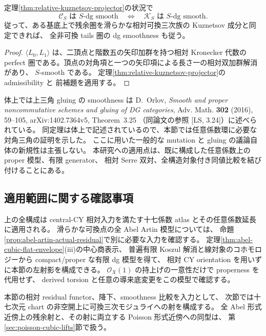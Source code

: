 \begin{corollary}
\label{cor:relative-kuznetsov-smooth-equivalence}
定理\ref{thm:relative-kuznetsov-projector}の状況で
\[
 \mathcal C_S\text{ は }S\text{-dg smooth}
 \quad\Longleftrightarrow\quad
 \mathcal K_S\text{ は }S\text{-dg smooth}.
\]
従って、ある基底上で残余圏を滑らかな相対可換三次族の Kuznetsov 成分と同定できれば、
全非可換 tails 圏の dg smoothness も従う。
\end{corollary}
\begin{proof}
$\langle L_0,L_1\rangle$ は、二頂点と階数五の矢印加群を持つ相対 Kronecker 代数の
perfect 圏である。頂点の対角項と一つの矢印項による長さ一の相対双加群解消があり、
$S$-smooth である。
定理\ref{thm:relative-kuznetsov-projector}の admissibility と
前補題を適用する。
\end{proof}

\begin{remark}
体上では上三角 gluing の smoothness は
D.~Orlov, \emph{Smooth and proper noncommutative schemes and gluing of DG categories},
Adv. Math. \textbf{302} (2016), 59--105,
arXiv:1402.7364v5, Theorem~3.25
（同論文の参照 [LS, 3.24]）に述べられている。
同定理は体上で記述されているので、本節では任意係数環に必要な対角三角の証明を示した。
ここに用いた一般的な mutation と gluing の議論自体の新規性は主張しない。
本研究への適用点は、既に構成した任意係数上の proper 模型、有限 generator、
相対 Serre 双対、全構造対象付き同値比較を結び付けることにある。
\end{remark}

\subsection{適用範囲に関する確認事項}

上の全構成は central-CY 相対入力を満たす十七係数 atlas とその任意係数延長に適用される。
滑らかな可換点の全 Abel Artin 模型については、
命題\ref{prop:abel-artin-actual-residual}で別に必要な入力を確認する。
定理\ref{thm:abel-cubic-flat-envelope}\textup{(iii)}の中心商表示、
普遍有限 Koszul 解消と線対象のコホモロジーから compact/proper な有限 dg 模型を得て、
相対 CY orientation を用いずに本節の左射影を構成できる。
$\mathcal O_X(1)$ の持上げの一意性だけで properness を代用せず、
derived torsion と任意の導来底変更をこの模型で確認する。

本節の相対 residual functor、降下、smoothness 比較を入力として、
次節では十七次元 chart の非空開上に可換三次モジュライへの射を構成する。
全 Abel 形式近傍上の残余射と、その射に両立する Poisson 形式近傍への同型は、
第\ref{sec:poisson-cubic-lifts}節で扱う。
